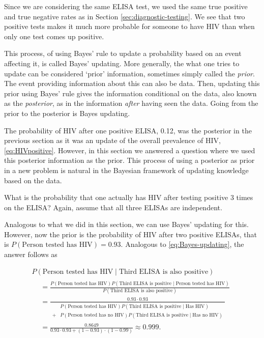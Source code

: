 \documentclass[]{book}
\theoremstyle{definition}
\theoremstyle{definition}
\theoremstyle{definition}
\theoremstyle{remark}
\let\BeginKnitrBlock\begin \let\EndKnitrBlock\end
\begin{document}
Since we are considering the same ELISA test, we used the same true
positive and true negative rates as in Section
\ref{sec:diagnostic-testing}. We see that two positive tests makes it
much more probable for someone to have HIV than when only one test comes
up positive.

This process, of using Bayes' rule to update a probability based on an
event affecting it, is called Bayes' updating. More generally, the what
one tries to update can be considered `prior' information, sometimes
simply called the \emph{prior}. The event providing information about
this can also be data. Then, updating this prior using Bayes' rule gives
the information conditional on the data, also known as the
\emph{posterior}, as in the information \emph{after} having seen the
data. Going from the prior to the posterior is Bayes updating.

The probability of HIV after one positive ELISA, 0.12, was the posterior
in the previous section as it was an update of the overall prevalence of
HIV, \eqref{eq:HIVpositive}. However, in this section we answered a
question where we used this posterior information as the prior. This
process of using a posterior as prior in a new problem is natural in the
Bayesian framework of updating knowledge based on the data.

\BeginKnitrBlock{example}
\protect\hypertarget{exm:unnamed-chunk-6}{}\label{exm:unnamed-chunk-6} What
is the probability that one actually has HIV after testing positive 3
times on the ELISA? Again, assume that all three ELISAs are independent.
\EndKnitrBlock{example}

Analogous to what we did in this section, we can use Bayes' updating for
this. However, now the prior is the probability of HIV after two
positive ELISAs, that is \(P(\text{Person tested has HIV}) = 0.93\).
Analogous to \eqref{eq:Bayes-updating}, the answer follows as

\begin{multline}
  P(\text{Person tested has HIV} \mid \text{Third ELISA is also positive}) \\
  \begin{split}
  &= \frac{P(\text{Person tested has HIV}) P(\text{Third ELISA is positive} \mid \text{Person tested has HIV})}{P(\text{Third ELISA is also positive})} \\
  &= \frac{0.93 \cdot 0.93}{\begin{split}
  &P(\text{Person tested has HIV}) P(\text{Third ELISA is positive} \mid \text{Has HIV}) \\
  + &P(\text{Person tested has no HIV}) P(\text{Third ELISA is positive} \mid \text{Has no HIV})
  \end{split}} \\
  &= \frac{0.8649}{0.93 \cdot 0.93 + (1 - 0.93)\cdot (1 - 0.99)} \approx 0.999.
  \end{split}
\end{multline}
\end{document}
